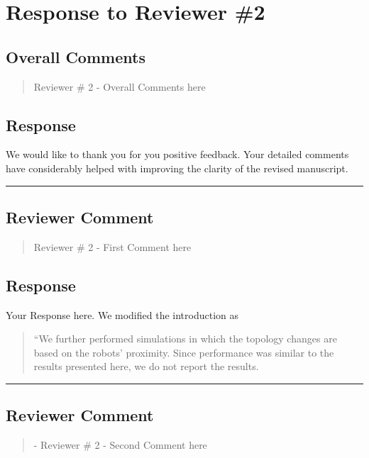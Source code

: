 \section{Response to Reviewer \#2}
\subsection*{Overall Comments}
\begin{mdframed}
\begin{quote}
	 Reviewer \# 2 - Overall Comments here
\end{quote}
\end{mdframed}

\subsection{Response} 
We would like to thank you for you positive feedback. Your detailed comments have considerably helped with improving the clarity of the revised manuscript.

\noindent\rule{17cm}{2.0pt}

\subsection{Reviewer Comment}
\begin{mdframed}
\begin{quote}
	Reviewer \# 2 - First Comment here
\end{quote}
\end{mdframed}

\subsection{Response} 
Your Response here. We modified the introduction as

\begin{quote}
	``We further performed simulations in which the topology changes are based on the robots' proximity. Since performance was similar to the results presented here, we do not report the results.
\end{quote}

\noindent\rule{17cm}{2.0pt}

\subsection{Reviewer Comment}
\begin{mdframed}
\begin{quote}
	- Reviewer \# 2 - Second Comment here
\end{quote}
\end{mdframed}

